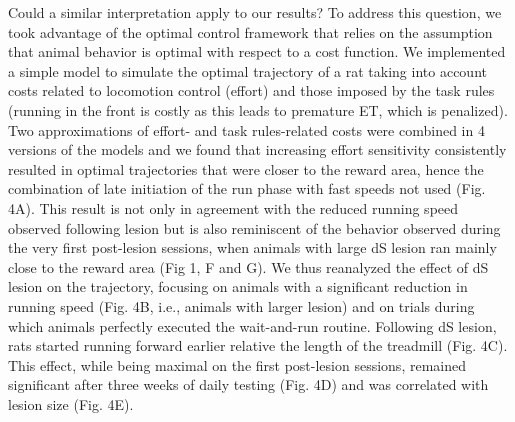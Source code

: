 Could a similar interpretation apply to our results?
To address this question, we took advantage of the optimal control framework that relies on the assumption that animal behavior is optimal with respect to a cost function.
We implemented a simple model to simulate the optimal trajectory of a rat taking into account costs related to locomotion control (effort) and those imposed by the task rules (running in the front is costly as this leads to premature ET, which is penalized).
Two approximations of effort- and task rules-related costs were combined in 4 versions of the models and we found that increasing effort sensitivity consistently resulted in optimal trajectories that were closer to the reward area, hence the combination of late initiation of the run phase with fast speeds not used (Fig. 4A).
This result is not only in agreement with the reduced running speed observed following lesion but is also reminiscent of the behavior observed during the very first post-lesion sessions, when animals with large dS lesion ran mainly close to the reward area (Fig 1, F and G). 
We thus reanalyzed the effect of dS lesion on the trajectory, focusing on animals with a significant reduction in running speed (Fig. 4B, i.e., animals with larger lesion) and on trials during which animals perfectly executed the wait-and-run routine.
Following dS lesion, rats started running forward earlier relative the length of the treadmill (Fig. 4C).
This effect, while being maximal on the first post-lesion sessions, remained significant after three weeks of daily testing (Fig. 4D) and was correlated with lesion size (Fig. 4E).














